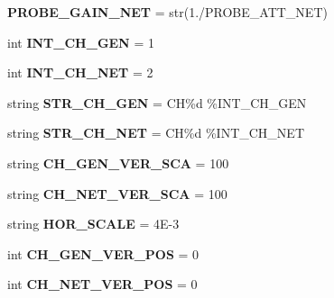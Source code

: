 \begin{DoxyCompactItemize}
{\bfseries P\+R\+O\+B\+E\+\_\+\+G\+A\+I\+N\+\_\+\+N\+ET} = str(1./P\+R\+O\+B\+E\+\_\+\+A\+T\+T\+\_\+\+N\+ET)
\item 
\mbox{\label{namespacescope_a9ed177f456d6aece325c445d871c2a5f}} 
int {\bfseries I\+N\+T\+\_\+\+C\+H\+\_\+\+G\+EN} = 1
\item 
\mbox{\label{namespacescope_a19811906aa25847fd51f8954e798881e}} 
int {\bfseries I\+N\+T\+\_\+\+C\+H\+\_\+\+N\+ET} = 2
\item 
\mbox{\label{namespacescope_a95f21afa24b3b605ba22ae4ed03b3e88}} 
string {\bfseries S\+T\+R\+\_\+\+C\+H\+\_\+\+G\+EN} = \textquotesingle{}CH\%d\textquotesingle{} \%I\+N\+T\+\_\+\+C\+H\+\_\+\+G\+EN
\item 
\mbox{\label{namespacescope_a3ac22ba0413a2914150dedd25e00d585}} 
string {\bfseries S\+T\+R\+\_\+\+C\+H\+\_\+\+N\+ET} = \textquotesingle{}CH\%d\textquotesingle{} \%I\+N\+T\+\_\+\+C\+H\+\_\+\+N\+ET
\item 
\mbox{\label{namespacescope_a1093dc15c7839bfcd362071df46df4a0}} 
string {\bfseries C\+H\+\_\+\+G\+E\+N\+\_\+\+V\+E\+R\+\_\+\+S\+CA} = \textquotesingle{}100\textquotesingle{}
\item 
\mbox{\label{namespacescope_a80068f668a408687c053b1633f69aca4}} 
string {\bfseries C\+H\+\_\+\+N\+E\+T\+\_\+\+V\+E\+R\+\_\+\+S\+CA} = \textquotesingle{}100\textquotesingle{}
\item 
\mbox{\label{namespacescope_a779cd5a07f5158422a889b53ce6090ba}} 
string {\bfseries H\+O\+R\+\_\+\+S\+C\+A\+LE} = \textquotesingle{}4\+E-\/3\textquotesingle{}
\item 
\mbox{\label{namespacescope_aeb8f8bc1d697710ccb771c89d9fa0800}} 
int {\bfseries C\+H\+\_\+\+G\+E\+N\+\_\+\+V\+E\+R\+\_\+\+P\+OS} = 0
\item 
\mbox{\label{namespacescope_a2eb8d7d8a60ba2c46f0642711c1aecf6}} 
int {\bfseries C\+H\+\_\+\+N\+E\+T\+\_\+\+V\+E\+R\+\_\+\+P\+OS} = 0
\end{DoxyCompactItemize}


